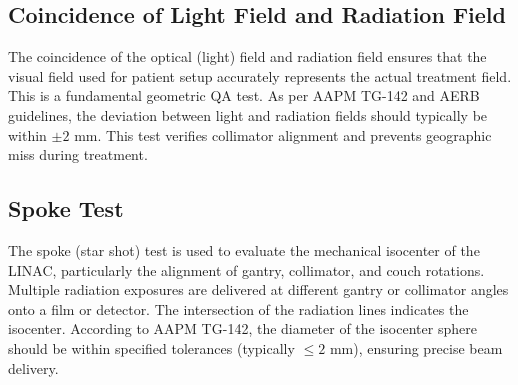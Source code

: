 \subsection{Coincidence of Light Field and Radiation Field}
The coincidence of the optical (light) field and radiation field ensures that the visual field used for patient setup accurately represents the actual treatment field. This is a fundamental geometric QA test. As per AAPM TG-142 and AERB guidelines, the deviation between light and radiation fields should typically be within $\pm 2\text{ mm}$. This test verifies collimator alignment and prevents geographic miss during treatment.

\subsection{Spoke Test}
The spoke (star shot) test is used to evaluate the mechanical isocenter of the LINAC, particularly the alignment of gantry, collimator, and couch rotations. Multiple radiation exposures are delivered at different gantry or collimator angles onto a film or detector. The intersection of the radiation lines indicates the isocenter. According to AAPM TG-142, the diameter of the isocenter sphere should be within specified tolerances (typically $\le 2\text{ mm}$), ensuring precise beam delivery.



